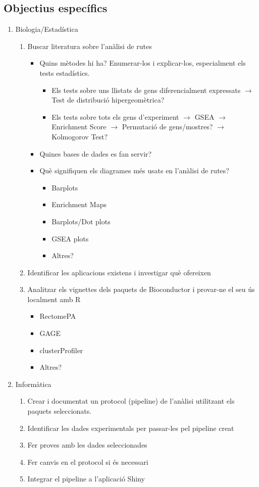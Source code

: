 \documentclass[]{article}
\begin{document}
\subsection{Objectius específics}
\begin{enumerate}
\item Biologia/Estadística
\begin{enumerate}
\item Buscar literatura sobre l'anàlisi de rutes
\begin{itemize}
\item Quins mètodes hi ha? Enumerar-los i explicar-los, especialment els tests estadístics.
\begin{itemize}
\item Els tests sobre uns llistats de gens diferencialment expressats $\rightarrow$ Test de distribució hipergeomètrica?
\item Els tests sobre tots els gens d'experiment $\rightarrow$ GSEA $\rightarrow$  Enrichment Score $\rightarrow$ Permutació de gens/mostres? $\rightarrow$ Kolmogorov Test?
\end{itemize}
\item Quines bases de dades es fan servir?
\item Què signifiquen els diagrames més usats en l'anàlisi de rutes?
\begin{itemize}
\item Barplots
\item Enrichment Maps
\item Barplots/Dot plots
\item GSEA plots
\item Altres?
\end{itemize}
\end{itemize}
\item Identificar les aplicacions existens i investigar què ofereixen
\item Analitzar els vignettes dels paquets de Bioconductor i provar-ne el seu ús localment amb R
\begin{itemize}
\item RectomePA
\item GAGE
\item clusterProfiler
\item Altres?
\end{itemize}
\end{enumerate}
\item Informàtica
\begin{enumerate}
\item Crear i documentat un protocol (pipeline) de l'anàlisi utilitzant els paquets seleccionats. 
\item Identificar les dades experimentals per passar-les pel pipeline creat
\item Fer proves amb les dades seleccionades
\item Fer canvis en el protocol si és necessari
\item Integrar el pipeline a l'aplicació Shiny
\end{enumerate}
\end{enumerate}
\end{document}
